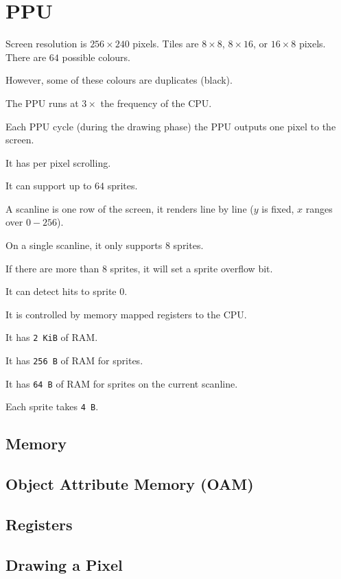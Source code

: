 \chapter{PPU}

Screen resolution is $256 \times 240$ pixels.
Tiles are $8 \times 8$, $8 \times 16$, or $16 \times 8$ pixels.
There are $64$ possible colours.

However, some of these colours are duplicates (black).

The PPU runs at $3 \times$ the frequency of the CPU.

Each PPU cycle (during the drawing phase) the PPU outputs one pixel to the
screen.

It has per pixel scrolling.

It can support up to $64$ sprites.

A scanline is one row of the screen, it renders line by line ($y$ is fixed, $x$
ranges over $0-256$).

On a single scanline, it only supports $8$ sprites.

If there are more than $8$ sprites, it will set a sprite overflow bit.

It can detect hits to sprite 0.

It is controlled by memory mapped registers to the CPU.

It has \texttt{2 KiB} of RAM.

It has \texttt{256 B} of RAM for sprites.

It has \texttt{64 B} of RAM for sprites on the current scanline.

Each sprite takes \texttt{4 B}.

\section{Memory}

\section{Object Attribute Memory (OAM)}

\section{Registers}

\section{Drawing a Pixel}

